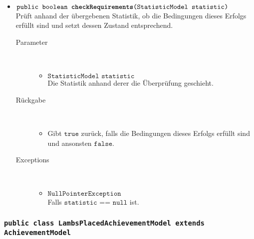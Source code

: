 \begin{description}
\begin{itemize}
		\item $\texttt{public boolean \textbf{checkRequirements}(StatisticModel statistic)}$ \\ Prüft anhand der übergebenen Statistik, ob die Bedingungen dieses Erfolgs erfüllt sind und setzt dessen Zustand entsprechend.
		\begin{description}
		\item[Parameter] \hfill \\
			\vspace{-.8cm}
			\begin{itemize}
				\item $\texttt{StatisticModel statistic}$ \\ Die Statistik anhand derer die Überprüfung geschieht. 
			\end{itemize}
			\item[Rückgabe] \hfill \\
			\vspace{-.8cm}
			\begin{itemize}
				\item Gibt $\texttt{true}$ zurück, falls die Bedingungen dieses Erfolgs erfüllt sind und ansonsten $\texttt{false}$.
			\end{itemize}
			\item[Exceptions] \hfill \\
			\vspace{-.8cm}
			\begin{itemize}
				\item $\texttt{NullPointerException}$ \\ Falls $\texttt{statistic == null}$ ist.
			\end{itemize}
		\end{description}
		
	\end{itemize}
\end{description}

\subsubsection{\normalfont \texttt{public class \textbf{LambsPlacedAchievementModel} extends AchievementModel}}

